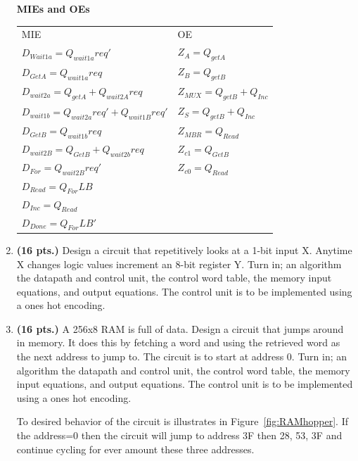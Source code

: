 \begin{enumerate}
\begin{solution}
{{\bf MIEs and OEs}

\begin{tabular}{ll}
MIE					&	OE			\\
$D_{Wait1a}= Q_{wait1a}req'$		&  $Z_{A} = Q_{getA}$		\\
$D_{GetA } = Q_{wait1a}req$		&  $Z_{B} = Q_{getB}$		\\
$D_{wait2a}= Q_{getA} + Q_{wait2A}req$	&  $Z_{MUX} = Q_{getB} + Q_{Inc}$		\\
$D_{wait1b}= Q_{wait2a}req' + Q_{wait1B}req'$	&  $Z_{S} = Q_{getB} + Q_{Inc}$		\\
$D_{GetB } = Q_{wait1b}req$		&  $Z_{MBR} = Q_{Read}$		\\
$D_{wait2B}= Q_{GetB} + Q_{wait2b}req$	&  $Z_{c1} = Q_{GetB}$		\\
$D_{For  } = Q_{wait2B}req'$		&  $Z_{c0} = Q_{Read}$		\\
$D_{Read } = Q_{For}LB$			&  		\\
$D_{Inc  } = Q_{Read}$			& 		\\
$D_{Done } = Q_{For}LB'$		&  		\\
\end{tabular}

} \end{solution}

\item  {\bf (16 pts.)}
Design a circuit that repetitively looks at a 1-bit input X.
Anytime X changes logic values increment an 8-bit
register Y.  
Turn in; an algorithm
the datapath and control unit,
the control word table,
the memory input equations, and
output equations.  
The control unit is to be implemented using a ones hot encoding.

\item {\bf (16 pts.)}
A 256x8 RAM is full of data.  Design a circuit that jumps
around in memory.  It does this by fetching a word and using the
retrieved word as the next address to jump to.  The circuit is to 
start at address 0. 
Turn in; an algorithm
the datapath and control unit,
the control word table,
the memory input equations, and
output equations.  
The control unit is to be implemented using a ones hot encoding.

To desired behavior of the circuit is illustrates in 
Figure~\ref{fig:RAMhopper}.  If the address=0 then the circuit will
jump to address 3F then 28, 53, 3F and continue cycling
for ever amount these three addresses.


\end{enumerate}
